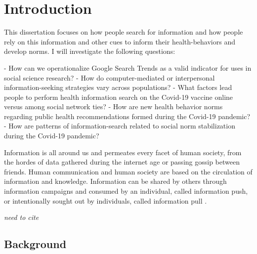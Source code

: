 \hypertarget{intro}{%
\chapter{Introduction}\label{intro}}


This dissertation focuses on how people search for information and how
people rely on this information and other cues to inform their
health-behaviors and develop norms. I will investigate the following
questions: 

- How can we operationalize Google Search Trends as a valid indicator for uses in social science research?    
- How do computer-mediated or interpersonal information-seeking strategies vary
across populations?
- What factors lead people to perform health information search on the Covid-19 vaccine online versus among social network ties? 
- How are new health behavior norms regarding public health recommendations formed during the Covid-19 pandemic?  
- How are patterns of information-search related to social norm stabilization during the Covid-19 pandemic?  

Information is all around us and permeates every facet of human society,
from the hordes of data gathered during the internet age or passing
gossip between friends. Human communication and human society are based
on the circulation of information and knowledge. Information can be
shared by others through information campaigns and consumed by an
individual, called information push, or intentionally sought out by
individuals, called information pull \citep{cybenkoFoundationsInformationPush1999}.

\emph{need to cite \citep{bayer_etal20, bossetta18}}

\section{Background}


